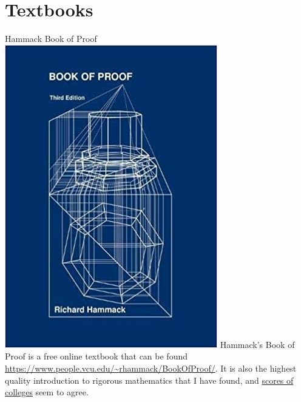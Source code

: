 \section{Textbooks}
\begin{boxResource}[lefthand width=5cm, sidebyside]{Hammack Book of Proof}
\includegraphics[width=\textwidth]{./img/Hammack_Proof}
\tcblower
Hammack's Book of Proof is a free online textbook that can be found \url{https://www.people.vcu.edu/~rhammack/BookOfProof/}.
It is also the highest quality introduction to rigorous mathematics that I have found, and \href{https://www.people.vcu.edu/~rhammack/BookOfProof/Adopters.html}{scores of colleges} seem to agree.
\end{boxResource}
%
